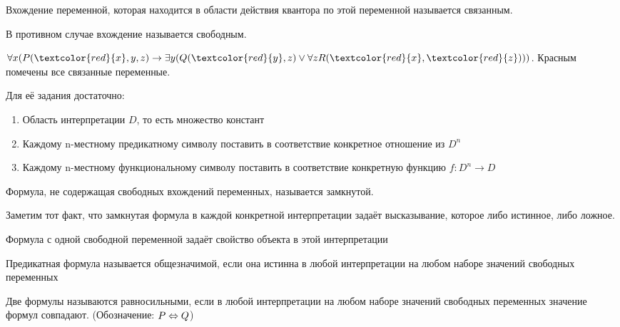 \documentclass[main]{subfiles}
\begin{document}
\begin{definition}
    Вхождение переменной, которая находится в области действия квантора по этой переменной называется связанным.
\end{definition}
\begin{definition}
    В противном случае вхождение называется свободным.
\end{definition}
\begin{example}
    $\forall x (P(\textcolor{red}{x},y,z) \to \exists y (Q(\textcolor{red}{y}, z) \lor \forall z R(\textcolor{red}{x}, \textcolor{red}{z})))$. Красным помечены все связанные переменные.
\end{example}
\begin{definition}[Интерпетация]
    Для её задания достаточно:
    \begin{enumerate}
        \item Область интерпретации $D$, то есть множество констант
        \item Каждому n-местному предикатному символу поставить в соответствие конкретное отношение из $D^n$
        \item Каждому n-местному функциональному символу поставить в соответствие конкретную функцию $f: D^n \to D$
    \end{enumerate}
\end{definition}
\begin{definition}
    Формула, не содержащая свободных вхождений переменных, называется замкнутой.
\end{definition}
Заметим тот факт, что замкнутая формула в каждой конкретной интерпретации задаёт высказывание, которое либо истинное, либо ложное.
\begin{definition}[Свойство]
    Формула с одной свободной переменной задаёт свойство объекта в этой интерпретации
\end{definition}
\begin{definition}[Общезначимость]
    Предикатная формула называется общезначимой, если она истинна в любой интерпретации на любом наборе значений свободных переменных
\end{definition}
\begin{definition}[Равносильность]
    Две формулы называются равносильными, если в любой интерпретации на любом наборе значений свободных переменных значение формул совпадают. (Обозначение: $P \Leftrightarrow Q$)
\end{definition}
\end{document}
